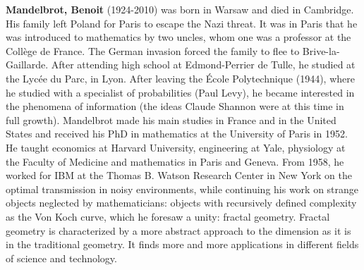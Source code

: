 \textbf{Mandelbrot, Benoit} (1924-2010) was born in Warsaw and died in Cambridge. His family left Poland for Paris to escape the Nazi threat. It was in Paris that he was introduced to mathematics by two uncles, whom one was a professor at the Collège de France. The German invasion forced the family to flee to Brive-la-Gaillarde. After attending high school at Edmond-Perrier de Tulle, he studied at the Lycée du Parc, in Lyon. After leaving the École Polytechnique (1944), where he studied with a specialist of probabilities (Paul Levy), he became interested in the phenomena of information (the ideas Claude Shannon were at this time in full growth). Mandelbrot made his main studies in France and in the United States and received his PhD in mathematics at the University of Paris in 1952. He taught economics at Harvard University, engineering at Yale, physiology at the Faculty of Medicine and mathematics in Paris and Geneva. From 1958, he worked for IBM at the Thomas B. Watson Research Center in New York on the optimal transmission in noisy environments, while continuing his work on strange objects neglected by mathematicians: objects with recursively defined complexity as the Von Koch curve, which he foresaw a unity: fractal geometry. Fractal geometry is characterized by a more abstract approach to the dimension as it is in the traditional geometry. It finds more and more applications in different fields of science and technology.

